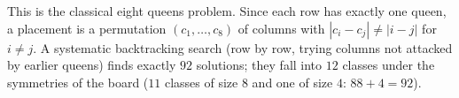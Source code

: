 This is the classical eight queens problem. Since each row has exactly one queen, a placement is a permutation $(c_1,\dots,c_8)$ of columns with $|c_i-c_j|\ne|i-j|$ for $i\ne j$. A systematic backtracking search (row by row, trying columns not attacked by earlier queens) finds exactly $\boxed{92}$ solutions; they fall into $12$ classes under the symmetries of the board ($11$ classes of size $8$ and one of size $4$: $88+4=92$).
